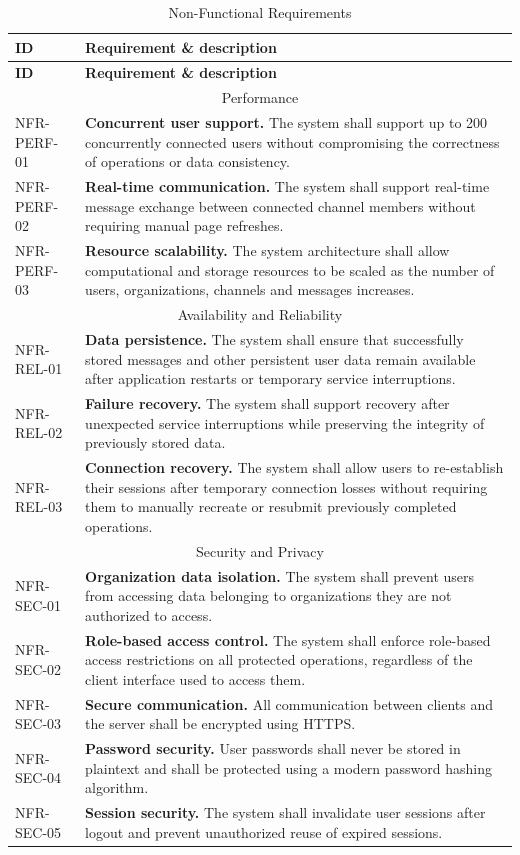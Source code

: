 \documentclass[
    english, %
]{VUMIFPSkursinis}
\newcommand{\frhead}{\textbf{ID} & \textbf{Requirement \& description} \\ \hline}
\begin{document}
\begin{longtable}{|p{}|p{}|}
\caption{Non-Functional Requirements}\\ \hline
\frhead
\endfirsthead
\hline \frhead
\endhead

\multicolumn{2}{|c|}{Performance} \\ \hline
NFR-PERF-01 & \textbf{Concurrent user support.} The system shall support up to 200 concurrently connected users without compromising the correctness of operations or data consistency. \\ \hline
NFR-PERF-02 & \textbf{Real-time communication.} The system shall support real-time message exchange between connected channel members without requiring manual page refreshes. \\ \hline
NFR-PERF-03 & \textbf{Resource scalability.} The system architecture shall allow computational and storage resources to be scaled as the number of users, organizations, channels and messages increases. \\ \hline

\multicolumn{2}{|c|}{Availability and Reliability} \\ \hline
NFR-REL-01 & \textbf{Data persistence.} The system shall ensure that successfully stored messages and other persistent user data remain available after application restarts or temporary service interruptions. \\ \hline
NFR-REL-02 & \textbf{Failure recovery.} The system shall support recovery after unexpected service interruptions while preserving the integrity of previously stored data. \\ \hline
NFR-REL-03 & \textbf{Connection recovery.} The system shall allow users to re-establish their sessions after temporary connection losses without requiring them to manually recreate or resubmit previously completed operations. \\ \hline

\multicolumn{2}{|c|}{Security and Privacy} \\ \hline
NFR-SEC-01 & \textbf{Organization data isolation.} The system shall prevent users from accessing data belonging to organizations they are not authorized to access. \\ \hline
NFR-SEC-02 & \textbf{Role-based access control.} The system shall enforce role-based access restrictions on all protected operations, regardless of the client interface used to access them. \\ \hline
NFR-SEC-03 & \textbf{Secure communication.} All communication between clients and the server shall be encrypted using HTTPS. \\ \hline
NFR-SEC-04 & \textbf{Password security.} User passwords shall never be stored in plaintext and shall be protected using a modern password hashing algorithm. \\ \hline
NFR-SEC-05 & \textbf{Session security.} The system shall invalidate user sessions after logout and prevent unauthorized reuse of expired sessions. \\ \hline


\end{longtable}
\end{document}
